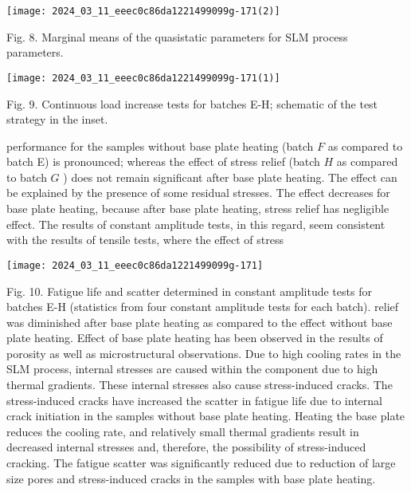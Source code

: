 \documentclass[10pt]{article}
\begin{document}
\begin{center}
\texttt{[image: 2024\_03\_11\_eeec0c86da1221499099g-171(2)]}
\end{center}

Fig. 8. Marginal means of the quasistatic parameters for SLM process parameters.

\begin{center}
\texttt{[image: 2024\_03\_11\_eeec0c86da1221499099g-171(1)]}
\end{center}

Fig. 9. Continuous load increase tests for batches E-H; schematic of the test strategy in the inset.

performance for the samples without base plate heating (batch $F$ as compared to batch E) is pronounced; whereas the effect of stress relief (batch $H$ as compared to batch $G$ ) does not remain significant after base plate heating. The effect can be explained by the presence of some residual stresses. The effect decreases for base plate heating, because after base plate heating, stress relief has negligible effect. The results of constant amplitude tests, in this regard, seem consistent with the results of tensile tests, where the effect of stress

\begin{center}
\texttt{[image: 2024\_03\_11\_eeec0c86da1221499099g-171]}
\end{center}

Fig. 10. Fatigue life and scatter determined in constant amplitude tests for batches E-H (statistics from four constant amplitude tests for each batch). relief was diminished after base plate heating as compared to the effect without base plate heating. Effect of base plate heating has been observed in the results of porosity as well as microstructural observations. Due to high cooling rates in the SLM process, internal stresses are caused within the component due to high thermal gradients. These internal stresses also cause stress-induced cracks. The stress-induced cracks have increased the scatter in fatigue life due to internal crack initiation in the samples without base plate heating. Heating the base plate reduces the cooling rate, and relatively small thermal gradients result in decreased internal stresses and, therefore, the possibility of stress-induced cracking. The fatigue scatter was significantly reduced due to reduction of large size pores and stress-induced cracks in the samples with base plate heating.
\end{document}
